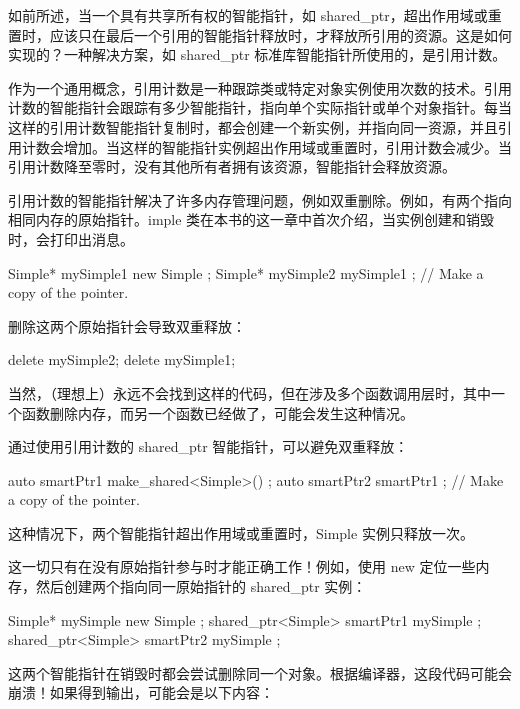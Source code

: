 
如前所述，当一个具有共享所有权的智能指针，如 shared\_ptr，超出作用域或重置时，应该只在最后一个引用的智能指针释放时，才释放所引用的资源。这是如何实现的？一种解决方案，如 shared\_ptr 标准库智能指针所使用的，是引用计数。

作为一个通用概念，引用计数是一种跟踪类或特定对象实例使用次数的技术。引用计数的智能指针会跟踪有多少智能指针，指向单个实际指针或单个对象指针。每当这样的引用计数智能指针复制时，都会创建一个新实例，并指向同一资源，并且引用计数会增加。当这样的智能指针实例超出作用域或重置时，引用计数会减少。当引用计数降至零时，没有其他所有者拥有该资源，智能指针会释放资源。

引用计数的智能指针解决了许多内存管理问题，例如双重删除。例如，有两个指向相同内存的原始指针。imple 类在本书的这一章中首次介绍，当实例创建和销毁时，会打印出消息。

\begin{cpp}
Simple* mySimple1 { new Simple{} };
Simple* mySimple2 { mySimple1 }; // Make a copy of the pointer.
\end{cpp}

删除这两个原始指针会导致双重释放：

\begin{cpp}
delete mySimple2;
delete mySimple1;
\end{cpp}

当然，（理想上）永远不会找到这样的代码，但在涉及多个函数调用层时，其中一个函数删除内存，而另一个函数已经做了，可能会发生这种情况。

通过使用引用计数的 shared\_ptr 智能指针，可以避免双重释放：

\begin{cpp}
auto smartPtr1 { make_shared<Simple>() };
auto smartPtr2 { smartPtr1 }; // Make a copy of the pointer.
\end{cpp}

这种情况下，两个智能指针超出作用域或重置时，Simple 实例只释放一次。

这一切只有在没有原始指针参与时才能正确工作！例如，使用 new 定位一些内存，然后创建两个指向同一原始指针的 shared\_ptr 实例：

\begin{cpp}
Simple* mySimple { new Simple{} };
shared_ptr<Simple> smartPtr1 { mySimple };
shared_ptr<Simple> smartPtr2 { mySimple };
\end{cpp}

这两个智能指针在销毁时都会尝试删除同一个对象。根据编译器，这段代码可能会崩溃！如果得到输出，可能会是以下内容：

